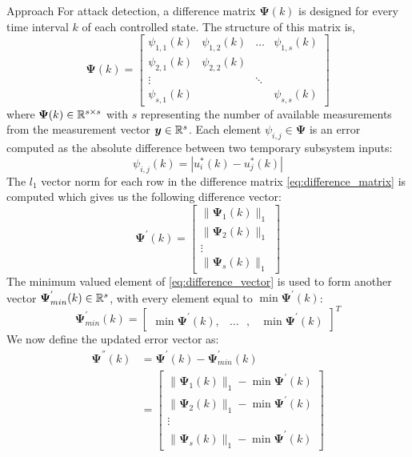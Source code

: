 \begin{section}{Approach}
For attack detection, a difference matrix $\bm{\Psi}(k)$ is designed for every time interval $k$ of each controlled state. The structure of this matrix is,
    \begin{equation}
    \label{eq:difference_matrix}
	\bm{\Psi}(k)=\begin{bmatrix} \psi_{1,1}(k) & \psi_{1,2}(k) & \dots & \psi_{1,s}(k) \\ \psi_{2,1}(k) & \psi_{2,2}(k) &  &  \\ \vdots &  & \ddots &  \\ \psi_{s,1}(k) &  &  & \psi_{s,s}(k) \end{bmatrix}
	\end{equation}
where $\bm{\Psi}(k) \in \mathbb{R}^{s\times s}$ with $s$ representing the number of available measurements from the measurement vector $\bm{y} \in \mathbb{R}^s$. Each element $\psi_{i,j}\in\bm{\Psi}$ is an error computed as the absolute difference between two temporary subsystem inputs:
    \begin{equation}
        \psi_{i,j}(k)=|u^*_i(k)-u^*_j(k)|
    \end{equation}
The $l_1$ vector norm for each row in the difference matrix \eqref{eq:difference_matrix} is computed which gives us the following difference vector:
    \begin{equation}
    \label{eq:difference_vector}
	\bm{\Psi^{'}}(k)=\begin{bmatrix} \lVert{\bm{\Psi}_1(k)}\rVert_1 \\ \lVert{\bm{\Psi}_2(k)}\rVert_1 \\ \vdots \\ \lVert{\bm{\Psi}_s(k)}\rVert_1 \end{bmatrix}
	\end{equation}
The minimum valued element of \eqref{eq:difference_vector} is used to form another vector $\bm{\Psi}^{'}_{min}(k) \in \mathbb{R}^s$, with every element equal to $\min \bm{\Psi}^{'}(k)$:
    \begin{equation}
	\bm{\Psi}^{'}_{min}(k)=\begin{bmatrix} \min \bm{\Psi}^{'}(k),& \dots \text{ },&\min \bm{\Psi}^{'}(k) \end{bmatrix}^T
	\end{equation}
We now define the updated error vector as:
    \begin{align}
    \label{eq:Psi2}
	\bm{\Psi^{''}}(k)&=\bm{\Psi^{'}}(k)-\bm{\Psi}^{'}_{min}(k) \\
	& =\begin{bmatrix} \lVert{\bm{\Psi}_1(k)}\rVert_1 - \min \bm{\Psi}^{'}(k)\\ \lVert{\bm{\Psi}_2(k)}\rVert_1 - \min \bm{\Psi}^{'}(k) \\ \vdots \\ \lVert{\bm{\Psi}_s(k)}\rVert_1 - \min \bm{\Psi}^{'}(k) \end{bmatrix}
	\end{align}
	

\end{section}
